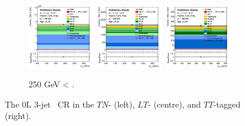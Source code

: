 \begin{figure}[h!]
\begin{subfigure}[b]{\textwidth}
        \includegraphics[width=0.32\textwidth]{Images/VH/Own_fit/postfit_VHcc/Region_distmBB_BMin250_DCRHigh_J3_TTypent_T1_L0_Y6051_GlobalFit_conditionnal_mu1.png}
        \includegraphics[width=0.32\textwidth]{Images/VH/Own_fit/postfit_VHcc/Region_distmBB_BMin250_DCRHigh_J3_TTypelt_T2_L0_Y6051_GlobalFit_conditionnal_mu1.png}
        \includegraphics[width=0.32\textwidth]{Images/VH/Own_fit/postfit_VHcc/Region_distmBB_BMin250_DCRHigh_J3_TTypett_T2_L0_Y6051_GlobalFit_conditionnal_mu1.png}
        \caption{250 GeV < \ptv.}
        \label{fig:plots_VHcc_OL_250_CRH_2c_3J}
    \end{subfigure}
    \caption{The 0L 3-jet \highdr\ CR in the $TN$- (left), $LT$- (centre), and $TT$-tagged (right).}
    \label{fig:plots_VHcc_OL_CRH_2c_3J}
\end{figure} 

\vspace*{\fill} 

